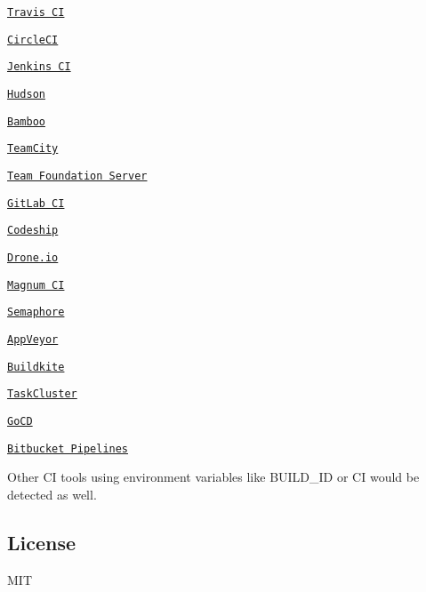 \begin{DoxyItemize}
\item \href{http://travis-ci.org}{\tt Travis CI}
\item \href{http://circleci.com}{\tt Circle\+CI}
\item \href{https://jenkins-ci.org}{\tt Jenkins CI}
\item \href{http://hudson-ci.org}{\tt Hudson}
\item \href{https://www.atlassian.com/software/bamboo}{\tt Bamboo}
\item \href{https://www.jetbrains.com/teamcity/}{\tt Team\+City}
\item \href{https://www.visualstudio.com/en-us/products/tfs-overview-vs.aspx}{\tt Team Foundation Server}
\item \href{https://about.gitlab.com/gitlab-ci/}{\tt Git\+Lab CI}
\item \href{https://codeship.com}{\tt Codeship}
\item \href{https://drone.io}{\tt Drone.\+io}
\item \href{https://magnum-ci.com}{\tt Magnum CI}
\item \href{https://semaphoreci.com}{\tt Semaphore}
\item \href{http://www.appveyor.com}{\tt App\+Veyor}
\item \href{https://buildkite.com}{\tt Buildkite}
\item \href{http://docs.taskcluster.net}{\tt Task\+Cluster}
\item \href{https://www.go.cd/}{\tt Go\+CD}
\item \href{https://bitbucket.org/product/features/pipelines}{\tt Bitbucket Pipelines}
\end{DoxyItemize}

Other CI tools using environment variables like {\ttfamily B\+U\+I\+L\+D\+\_\+\+ID} or {\ttfamily CI} would be detected as well.

\subsection*{License}

M\+IT 